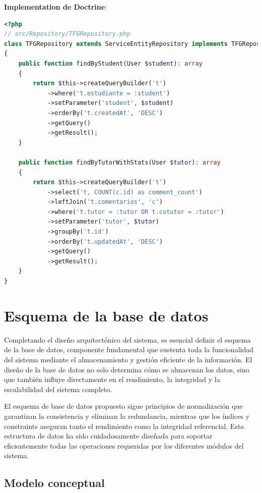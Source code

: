 \documentclass[12pt,a4paper,oneside]{report}
\begin{document}
\textbf{Implementation de Doctrine}:

\begin{lstlisting}[language=PHP]
<?php
// src/Repository/TFGRepository.php
class TFGRepository extends ServiceEntityRepository implements TFGRepositoryInterface
{
    public function findByStudent(User $student): array
    {
        return $this->createQueryBuilder('t')
            ->where('t.estudiante = :student')
            ->setParameter('student', $student)
            ->orderBy('t.createdAt', 'DESC')
            ->getQuery()
            ->getResult();
    }
    
    public function findByTutorWithStats(User $tutor): array
    {
        return $this->createQueryBuilder('t')
            ->select('t, COUNT(c.id) as comment_count')
            ->leftJoin('t.comentarios', 'c')
            ->where('t.tutor = :tutor OR t.cotutor = :tutor')
            ->setParameter('tutor', $tutor)
            ->groupBy('t.id')
            ->orderBy('t.updatedAt', 'DESC')
            ->getQuery()
            ->getResult();
    }
}
\end{lstlisting}

\section{Esquema de la base de datos}\label{esquema-de-la-base-de-datos}

Completando el diseño arquitectónico del sistema, es esencial definir el
esquema de la base de datos, componente fundamental que sustenta toda la
funcionalidad del sistema mediante el almacenamiento y gestión eficiente
de la información. El diseño de la base de datos no solo determina cómo
se almacenan los datos, sino que también influye directamente en el
rendimiento, la integridad y la escalabilidad del sistema completo.

El esquema de base de datos propuesto sigue principios de normalización
que garantizan la consistencia y eliminan la redundancia, mientras que
los índices y constraints aseguran tanto el rendimiento como la
integridad referencial. Esta estructura de datos ha sido cuidadosamente
diseñada para soportar eficientemente todas las operaciones requeridas
por los diferentes módulos del sistema.

\subsection{Modelo conceptual}\label{modelo-conceptual}
\end{document}
